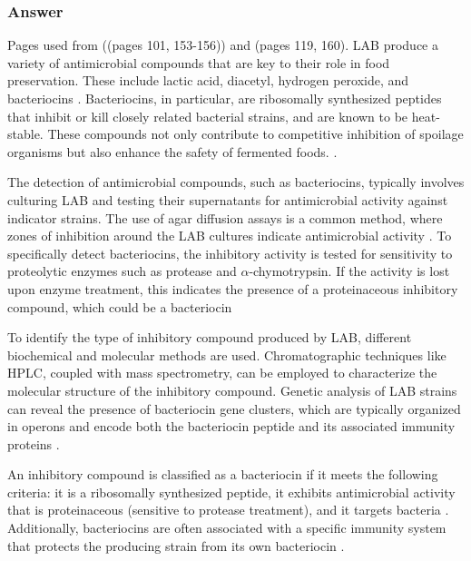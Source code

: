 \subsubsection*{Answer}
Pages used from \cite*{L3-LAB} ((pages 101, 153-156)) and \cite*{L8-MicroInFood} (pages 119, 160).
LAB produce a variety of antimicrobial compounds that are key to their role in food preservation. These include lactic acid, diacetyl, hydrogen peroxide, and bacteriocins \cite*{L3-LAB}. Bacteriocins, in particular, are ribosomally synthesized peptides that inhibit or kill closely related bacterial strains, and are known to be heat-stable. These compounds not only contribute to competitive inhibition of spoilage organisms but also enhance the safety of fermented foods. \cite*{L3-LAB}.

The detection of antimicrobial compounds, such as bacteriocins, typically involves culturing LAB and testing their supernatants for antimicrobial activity against indicator strains. The use of agar diffusion assays is a common method, where zones of inhibition around the LAB cultures indicate antimicrobial activity \cite*{L3-LAB}. To specifically detect bacteriocins, the inhibitory activity is tested for sensitivity to proteolytic enzymes such as protease and $\alpha$-chymotrypsin. If the activity is lost upon enzyme treatment, this indicates the presence of a proteinaceous inhibitory compound, which could be a bacteriocin \cite*{L3-LAB}

To identify the type of inhibitory compound produced by LAB, different biochemical and molecular methods are used. Chromatographic techniques like HPLC, coupled with mass spectrometry, can be employed to characterize the molecular structure of the inhibitory compound. Genetic analysis of LAB strains can reveal the presence of bacteriocin gene clusters, which are typically organized in operons and encode both the bacteriocin peptide and its associated immunity proteins \cite*{L3-LAB}.

An inhibitory compound is classified as a bacteriocin if it meets the following criteria: it is a ribosomally synthesized peptide, it exhibits antimicrobial activity that is proteinaceous (sensitive to protease treatment), and it targets bacteria \cite*{L3-LAB}. Additionally, bacteriocins are often associated with a specific immunity system that protects the producing strain from its own bacteriocin \cite*{L3-LAB}.

